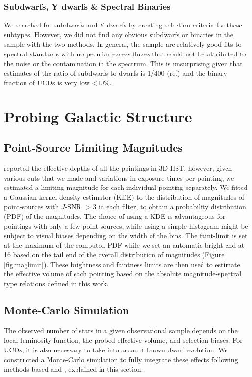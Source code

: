 \documentclass[manuscript]{aastex63}
\begin{document}
\subsubsection{ Subdwarfs, Y dwarfs  \& Spectral Binaries}
We searched for subdwarfs and Y dwarfs by creating selection criteria for these subtypes. However, we did not find any obvious subdwarfs or binaries in the sample with the two methods. In general, the sample are relatively good fits to spectral standards with no peculiar excess fluxes that could not be attributed to the noise or the contamination in the spectrum. This is unsurprising given that estimates of the ratio of subdwarfs to dwarfs is 1/400 (ref) and the binary fraction of UCDs is very low \textless 10\%. 


\section{Probing Galactic Structure}\label{sec:simulations}

\subsection{ Point-Source Limiting Magnitudes}
\citet{Momcheva2016} reported the effective depths of all the pointings in 3D-HST, however, given various cuts that we made and variations in exposure times per pointing, we estimated a limiting magnitude for each individual pointing separately. We fitted a Gaussian kernel density estimator (KDE) to the distribution of magnitudes of point-sources with $J$-SNR $> 3$ in each filter, to obtain a probability distribution (PDF) of the magnitudes. The choice of using a KDE is advantageous for pointings with only a few point-sources, while using a simple histogram might be subject to visual biases depending on the width of the bins. The faint-limit is set at the maximum of the computed PDF while we set an automatic bright end at 16 based on the tail end of the overall distribution of magnitudes (Figure \ref{fig:maglimit}). These brightness and faintness limits are then used to estimate the effective volume of each pointing based on the absolute magnitude-spectral type relations defined in this work. 

\subsection{Monte-Carlo Simulation}
The observed number of stars in a given observational sample depends on the local luminosity function, the probed effective volume, and selection biases. For UCDs, it is also necessary to take into account brown dwarf evolution. We constructed a Monte-Carlo simulation to fully integrate these effects following methods based \cite{1999ApJ...521..613R} and \cite{2004ApJS..155..191B}, explained in this section.
\end{document}
